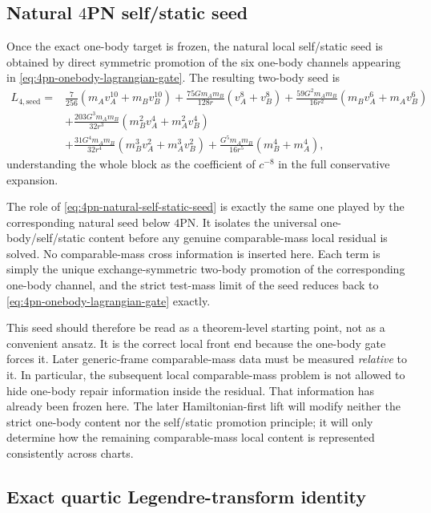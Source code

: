 \documentclass[11pt]{article}
\begin{document}
\subsection{Natural \texorpdfstring{$4$}{4}PN self/static seed}
\label{sec:onebody-seed}

Once the exact one-body target is frozen, the natural local self/static seed is
obtained by direct symmetric promotion of the six one-body channels appearing in
\eqref{eq:4pn-onebody-lagrangian-gate}.  The resulting two-body seed is
\begin{equation}
\begin{aligned}
L_{4,\mathrm{seed}}={}&
\frac{7}{256}(m_A v_A^{10}+m_B v_B^{10})
+\frac{75Gm_A m_B}{128r}(v_A^8+v_B^8)
+\frac{59G^2m_A m_B}{16r^2}(m_B v_A^6+m_A v_B^6)
\\[0.5ex]
&
+\frac{203G^3m_A m_B}{32r^3}(m_B^2 v_A^4+m_A^2 v_B^4)
\\[0.5ex]
&
+\frac{31G^4m_A m_B}{32r^4}(m_B^3 v_A^2+m_A^3 v_B^2)
+\frac{G^5m_A m_B}{16r^5}(m_B^4+m_A^4),
\end{aligned}
\label{eq:4pn-natural-self-static-seed}
\end{equation}
understanding the whole block as the coefficient of $c^{-8}$ in the full
conservative expansion.

The role of \eqref{eq:4pn-natural-self-static-seed} is exactly the same one
played by the corresponding natural seed below $4$PN.  It isolates the
universal one-body/self/static content before any genuine comparable-mass local
residual is solved.  No comparable-mass cross information is inserted here.
Each term is simply the unique exchange-symmetric two-body promotion of the
corresponding one-body channel, and the strict test-mass limit of the seed
reduces back to \eqref{eq:4pn-onebody-lagrangian-gate} exactly.

This seed should therefore be read as a theorem-level starting point, not as a
convenient ansatz.  It is the correct local front end because the one-body gate
forces it.  Later generic-frame comparable-mass data must be measured
\emph{relative} to it.  In particular, the subsequent local comparable-mass
problem is not allowed to hide one-body repair information inside the residual.
That information has already been frozen here.  The later Hamiltonian-first lift
will modify neither the strict one-body content nor the self/static promotion
principle; it will only determine how the remaining comparable-mass local
content is represented consistently across charts.

\subsection{Exact quartic Legendre-transform identity}
\label{sec:onebody-quartic-compiler}
\end{document}
